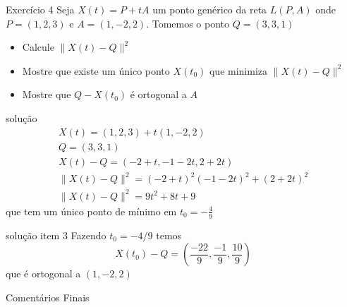 \documentclass{beamer}
\begin{document}
\begin{frame}{Exercício 4}
Seja $X(t) = P + tA$ um ponto genérico da reta $L(P,A)$ onde $P=(1,2,3)$ e $A=(1,-2,2).$ Tomemos o ponto $Q=(3,3,1)$
\begin{itemize}
    \item Calcule $\| X(t) - Q \|^2$
    \item Mostre que existe um único ponto $X(t_0)$ que minimiza $\| X(t) - Q \|^2$
    \item Mostre que $Q-X(t_0)$ é ortogonal a $A$
\end{itemize}
    \end{frame}

    \begin{frame}{solução}
     \begin{gather*}
       X(t) = (1,2,3)+t(1,-2,2) \\
       Q=(3,3,1)\\
       X(t)-Q =(-2+t,-1-2t,2+2t)\\
       \|X(t)-Q\|^2 = (-2+t)^2 (-1-2t)^2+(2+2t)^2\\
       \|X(t)-Q\|^2 = 9t^2 + 8t +9
     \end{gather*} 
     que tem um único ponto de mínimo em $t_0=-\frac{4}{9}$
    \end{frame}
    \begin{frame}{solução item 3}
      Fazendo $t_0=-4/9$ temos
      $$X(t_0)-Q = (\frac{-22}{9}, \frac{-1}{9},\frac{10}{9})$$
      que é ortogonal a $(1,-2,2)$
    \end{frame}
    \begin{frame}{Comentários Finais}
      
    \end{frame}
\end{document}
